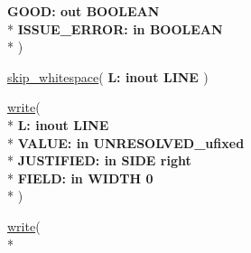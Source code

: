 \begin{DoxyCompactItemize}
  {\bfseries \textcolor{vhdlchar}{ }\textcolor{vhdlchar}{G\+O\+O\+D\+: }\textcolor{stringliteral}{} {\bfseries \textcolor{keywordflow}{out}\textcolor{vhdlchar}{ }\textcolor{comment}{B\+O\+O\+L\+E\+A\+N}\textcolor{vhdlchar}{ }}}\\*
  {\bfseries \textcolor{vhdlchar}{ }\textcolor{vhdlchar}{I\+S\+S\+U\+E\+\_\+\+E\+R\+R\+O\+R\+: }\textcolor{stringliteral}{} {\bfseries \textcolor{keywordflow}{in}\textcolor{vhdlchar}{ }\textcolor{comment}{B\+O\+O\+L\+E\+A\+N}\textcolor{vhdlchar}{ }}}\\*
   )
\item 
{\bfseries {\bfseries \textcolor{vhdlchar}{ }}} \hyperlink{class__fixed__pkg_addb4d4d6f3faa66bcf78b6be3585267e}{skip\+\_\+whitespace}( {\bfseries \textcolor{vhdlchar}{ }\textcolor{vhdlchar}{L\+: }\textcolor{stringliteral}{} {\bfseries \textcolor{keywordflow}{inout}\textcolor{vhdlchar}{ }\textcolor{vhdlchar}{L\+I\+N\+E}\textcolor{vhdlchar}{ }}} )
\item 
{\bfseries {\bfseries \textcolor{vhdlchar}{ }}} \hyperlink{class__fixed__pkg_a50939ad5084b27323fa46ce88fb5c299}{write}( \\*
{\bfseries \textcolor{vhdlchar}{ }\textcolor{vhdlchar}{L\+: }\textcolor{stringliteral}{} {\bfseries \textcolor{keywordflow}{inout}\textcolor{vhdlchar}{ }\textcolor{vhdlchar}{L\+I\+N\+E}\textcolor{vhdlchar}{ }}}\\*
  {\bfseries \textcolor{vhdlchar}{ }\textcolor{vhdlchar}{V\+A\+L\+U\+E\+: }\textcolor{stringliteral}{} {\bfseries \textcolor{keywordflow}{in}\textcolor{vhdlchar}{ }\textcolor{vhdlchar}{U\+N\+R\+E\+S\+O\+L\+V\+E\+D\+\_\+ufixed}\textcolor{vhdlchar}{ }}}\\*
  {\bfseries \textcolor{vhdlchar}{ }\textcolor{vhdlchar}{J\+U\+S\+T\+I\+F\+I\+E\+D\+: }\textcolor{stringliteral}{} {\bfseries \textcolor{keywordflow}{in}\textcolor{vhdlchar}{ }\textcolor{vhdlchar}{S\+I\+D\+E}\textcolor{vhdlchar}{ }\textcolor{vhdlchar}{ }\textcolor{vhdlchar}{ }\textcolor{vhdlchar}{ }\textcolor{vhdlchar}{ }\textcolor{vhdlkeyword}{right}\textcolor{vhdlchar}{ }}}\\*
  {\bfseries \textcolor{vhdlchar}{ }\textcolor{vhdlchar}{F\+I\+E\+L\+D\+: }\textcolor{stringliteral}{} {\bfseries \textcolor{keywordflow}{in}\textcolor{vhdlchar}{ }\textcolor{vhdlchar}{W\+I\+D\+T\+H}\textcolor{vhdlchar}{ }\textcolor{vhdlchar}{ }\textcolor{vhdlchar}{ } \textcolor{vhdldigit}{0} \textcolor{vhdlchar}{ }}}\\*
   )
\item 
{\bfseries {\bfseries \textcolor{vhdlchar}{ }}} \hyperlink{class__fixed__pkg_a50939ad5084b27323fa46ce88fb5c299}{write}( \\*

\end{DoxyCompactItemize}
